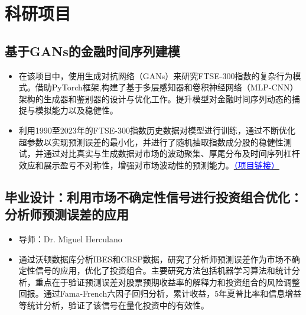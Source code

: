 \documentclass{resume}
\begin{document}
\hypersetup{
    colorlinks=true, %
    urlcolor=blue %
}
\section{科研项目}
\subsection{\textbf{基于GANs的金融时间序列建模}}
\begin{itemize}[itemsep=0.5ex, parsep=0.3ex]
    \item 在该项目中，使用生成对抗网络（GANs）来研究FTSE-300指数的复杂行为模式。借助PyTorch框架,构建了基于多层感知器和卷积神经网络（MLP-CNN）架构的生成器和鉴别器的设计与优化工作。提升模型对金融时间序列动态的捕捉与模拟能力以及稳健性。
    \item 利用1990至2023年的FTSE-300指数历史数据对模型进行训练，通过不断优化超参数以实现预测误差的最小化，并进行了随机抽取指数成分股的稳健性测试，并通过对比真实与生成数据对市场的波动聚集、厚尾分布及时间序列杠杆效应和展示盈亏不对称性，增强对市场波动性的预测能力。\href{https://github.com/LeiWangUog/Modeling-financial-time-series-GAN}{\textcolor{blue}{（项目链接）}}
\end{itemize}

\subsection{\textbf{毕业设计：利用市场不确定性信号进行投资组合优化：分析师预测误差的应用}}
\begin{itemize}[itemsep=0.3ex, parsep=0.3ex]
  \item 导师：Dr. Miguel Herculano
  \item 通过沃顿数据库分析IBES和CRSP数据，研究了分析师预测误差作为市场不确定性信号的应用，优化了投资组合。主要研究方法包括机器学习算法和统计分析，重点在于验证预测误差对股票预期收益率的解释力和投资组合的风险调整回报。通过Fama-French六因子回归分析，累计收益，5年夏普比率和信息增益等统计分析，验证了该信号在量化投资中的有效性。
\end{itemize}
\end{document}
